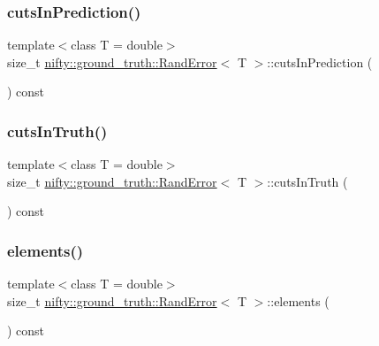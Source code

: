 \subsubsection{\texorpdfstring{cuts\+In\+Prediction()}{cutsInPrediction()}}
{\footnotesize\ttfamily template$<$class T  = double$>$ \\
size\+\_\+t \hyperlink{classnifty_1_1ground__truth_1_1RandError}{nifty\+::ground\+\_\+truth\+::\+Rand\+Error}$<$ T $>$\+::cuts\+In\+Prediction (\begin{DoxyParamCaption}{ }\end{DoxyParamCaption}) const\hspace{0.3cm}{\ttfamily [inline]}}

\mbox{\label{classnifty_1_1ground__truth_1_1RandError_a6b07ca1f99bd60f7ebd6188344a8a635}} 
\subsubsection{\texorpdfstring{cuts\+In\+Truth()}{cutsInTruth()}}
{\footnotesize\ttfamily template$<$class T  = double$>$ \\
size\+\_\+t \hyperlink{classnifty_1_1ground__truth_1_1RandError}{nifty\+::ground\+\_\+truth\+::\+Rand\+Error}$<$ T $>$\+::cuts\+In\+Truth (\begin{DoxyParamCaption}{ }\end{DoxyParamCaption}) const\hspace{0.3cm}{\ttfamily [inline]}}

\mbox{\label{classnifty_1_1ground__truth_1_1RandError_a4d379d420449072e4f22cbbfc4f74a89}} 
\subsubsection{\texorpdfstring{elements()}{elements()}}
{\footnotesize\ttfamily template$<$class T  = double$>$ \\
size\+\_\+t \hyperlink{classnifty_1_1ground__truth_1_1RandError}{nifty\+::ground\+\_\+truth\+::\+Rand\+Error}$<$ T $>$\+::elements (\begin{DoxyParamCaption}{ }\end{DoxyParamCaption}) const\hspace{0.3cm}{\ttfamily [inline]}}

